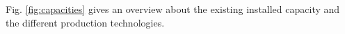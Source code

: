 


Fig. \ref{fig:capacities} gives an overview about the existing installed capacity and the different production technologies.




      


